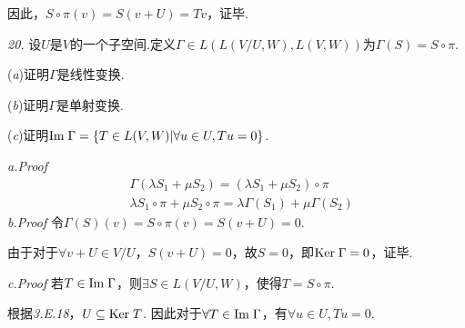 因此，\(S \circ \pi(v)=S(v+U)=Tv\)，证毕.

\hspace*{\fill}

\textit{20.}
设\(U\)是\(V\)的一个子空间.定义\(\Gamma \in L(L(V/U,W),L(V,W))\)为\(\Gamma(S)=S \circ \pi\).

(\textit{a})证明\(\Gamma\)是线性变换.

(\textit{b})证明\(\Gamma\)是单射变换.

(\textit{c})证明\(\mathrm{Im \;}  \Gamma=\{T \in L(V,W)|\forall u \in U,Tu=0 \}\).

\textit{a.Proof}
    \begin{align*}
        &\Gamma(\lambda S_1+\mu S_2)=(\lambda S_1+\mu S_2) \circ \pi \\
        &\lambda S_1 \circ \pi+\mu S_2 \circ \pi=\lambda \Gamma(S_1)+\mu \Gamma(S_2)
    \end{align*}
\textit{b.Proof}
令\(\Gamma(S)(v)=S \circ \pi(v)=S(v+U)=0\).

由于对于\(\forall v+U \in V/U\)，\(S(v+U)=0\)，故\(S=0\)，即\(\mathrm{Ker \;}  \Gamma=0\)，证毕.

\textit{c.Proof}
若\(T \in \mathrm{Im \;}  \Gamma\)，则\(\exists S \in L(V/U,W)\)，使得\(T=S \circ \pi\).

根据\textit{3.E.18}，\(U \subseteq \mathrm{Ker \;} T\).
因此对于\(\forall T \in \mathrm{Im \;} \Gamma\)，有\(\forall u \in U,Tu=0\).

